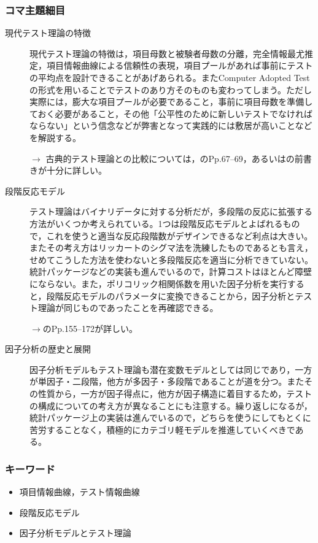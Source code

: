 \subsubsection{コマ主題細目}
\begin{description}
	\item[現代テスト理論の特徴]現代テスト理論の特徴は，項目母数と被験者母数の分離，完全情報最尤推定，項目情報曲線による信頼性の表現，項目プールがあれば事前にテストの平均点を設計できることがあげあられる。またComputer Adopted Testの形式を用いることでテストのあり方そのものも変わってしまう。ただし実際には，膨大な項目プールが必要であること，事前に項目母数を準備しておく必要があること，その他「公平性のために新しいテストでなければならない」という信念などが弊害となって実践的には敷居が高いことなどを解説する。

	      \begin{flushright}
		      $\to$ 古典的テスト理論との比較については，\textcite{Katoken2014}のPp.67--69，あるいは\textcite{Toyoda20120824}の前書きが十分に詳しい。
	      \end{flushright}


	\item[段階反応モデル] テスト理論はバイナリデータに対する分析だが，多段階の反応に拡張する方法がいくつか考えられている。1つは段階反応モデルとよばれるもので，これを使うと適当な反応段階数がデザインできるなど利点は大きい。またその考え方はリッカートのシグマ法を洗練したものであるとも言え，せめてこうした方法を使わないと多段階反応を適当に分析できていない。統計パッケージなどの実装も進んでいるので，計算コストはほとんど障壁にならない。また，ポリコリック相関係数を用いた因子分析を実行すると，段階反応モデルのパラメータに変換できることから，因子分析とテスト理論が同じものであったことを再確認できる。

	      \begin{flushright}
		      $\to$\textcite{Toyoda20120824}のPp.155--172が詳しい。
	      \end{flushright}

	\item[因子分析の歴史と展開]  因子分析モデルもテスト理論も潜在変数モデルとしては同じであり，一方が単因子・二段階，他方が多因子・多段階であることが道を分つ。またその性質から，一方が因子得点に，他方が因子構造に着目するため，テストの構成についての考え方が異なることにも注意する。繰り返しになるが，統計パッケージ上の実装は進んでいるので，どちらを使うにしてもとくに苦労することなく，積極的にカテゴリ軽モデルを推進していくべきである。
\end{description}
\subsubsection{キーワード}
\begin{itemize}
	\item 項目情報曲線，テスト情報曲線
	\item 段階反応モデル
	\item 因子分析モデルとテスト理論
\end{itemize}
